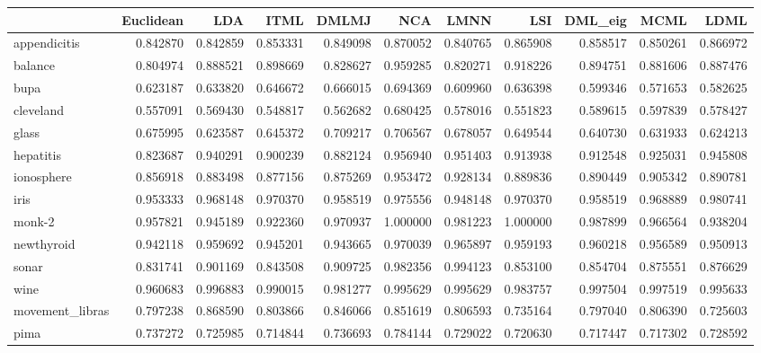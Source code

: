 \begin{tabular}{lrrrrrrrrrr}
\toprule
{} &  Euclidean &       LDA &      ITML &     DMLMJ &       NCA &      LMNN &       LSI &   DML\_eig &      MCML &      LDML \\
\midrule
appendicitis    &   0.842870 &  0.842859 &  0.853331 &  0.849098 &  0.870052 &  0.840765 &  0.865908 &  0.858517 &  0.850261 &  0.866972 \\
balance         &   0.804974 &  0.888521 &  0.898669 &  0.828627 &  0.959285 &  0.820271 &  0.918226 &  0.894751 &  0.881606 &  0.887476 \\
bupa            &   0.623187 &  0.633820 &  0.646672 &  0.666015 &  0.694369 &  0.609960 &  0.636398 &  0.599346 &  0.571653 &  0.582625 \\
cleveland       &   0.557091 &  0.569430 &  0.548817 &  0.562682 &  0.680425 &  0.578016 &  0.551823 &  0.589615 &  0.597839 &  0.578427 \\
glass           &   0.675995 &  0.623587 &  0.645372 &  0.709217 &  0.706567 &  0.678057 &  0.649544 &  0.640730 &  0.631933 &  0.624213 \\
hepatitis       &   0.823687 &  0.940291 &  0.900239 &  0.882124 &  0.956940 &  0.951403 &  0.913938 &  0.912548 &  0.925031 &  0.945808 \\
ionosphere      &   0.856918 &  0.883498 &  0.877156 &  0.875269 &  0.953472 &  0.928134 &  0.889836 &  0.890449 &  0.905342 &  0.890781 \\
iris            &   0.953333 &  0.968148 &  0.970370 &  0.958519 &  0.975556 &  0.948148 &  0.970370 &  0.958519 &  0.968889 &  0.980741 \\
monk-2          &   0.957821 &  0.945189 &  0.922360 &  0.970937 &  1.000000 &  0.981223 &  1.000000 &  0.987899 &  0.966564 &  0.938204 \\
newthyroid      &   0.942118 &  0.959692 &  0.945201 &  0.943665 &  0.970039 &  0.965897 &  0.959193 &  0.960218 &  0.956589 &  0.950913 \\
sonar           &   0.831741 &  0.901169 &  0.843508 &  0.909725 &  0.982356 &  0.994123 &  0.853100 &  0.854704 &  0.875551 &  0.876629 \\
wine            &   0.960683 &  0.996883 &  0.990015 &  0.981277 &  0.995629 &  0.995629 &  0.983757 &  0.997504 &  0.997519 &  0.995633 \\
movement\_libras &   0.797238 &  0.868590 &  0.803866 &  0.846066 &  0.851619 &  0.806593 &  0.735164 &  0.797040 &  0.806390 &  0.725603 \\
pima            &   0.737272 &  0.725985 &  0.714844 &  0.736693 &  0.784144 &  0.729022 &  0.720630 &  0.717447 &  0.717302 &  0.728592 \\

\end{tabular}
